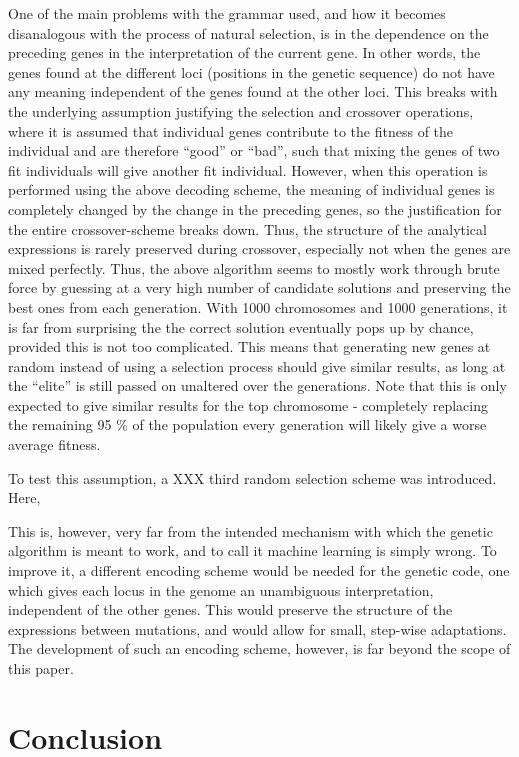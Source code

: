 \documentclass[multicolumn, 12pt]{extarticle}
\begin{document}
One of the main problems with the grammar used, and how it becomes disanalogous with the process of natural selection, is in the dependence on the preceding genes in the interpretation of the current gene. In other words, the genes found at the different loci (positions in the genetic sequence) do not have any meaning independent of the genes found at the other loci. This breaks with the underlying assumption justifying the selection and crossover operations, where it is assumed that individual genes contribute to the fitness of the individual and are therefore ``good'' or ``bad'', such that mixing the genes of two fit individuals will give another fit individual. However, when this operation is performed using the above decoding scheme, the meaning of individual genes is completely changed by the change in the preceding genes, so the justification for the entire crossover-scheme breaks down. Thus, the structure of the analytical expressions is rarely preserved during crossover, especially not when the genes are mixed perfectly. Thus, the above algorithm seems to mostly work through brute force by guessing at a very high number of candidate solutions and preserving the best ones from each generation. With 1000 chromosomes and 1000 generations, it is far from surprising the the correct solution eventually pops up by chance, provided this is not too complicated. This means that generating new genes at random instead of using a selection process should give similar results, as long at the ``elite'' is still passed on unaltered over the generations. Note that this is only expected to give similar results for the top chromosome - completely replacing the remaining 95 \% of the population every generation will likely give a worse average fitness.

To test this assumption, a XXX third random selection scheme was introduced. Here,


This is, however, very far from the intended mechanism with which the genetic algorithm is meant to work, and to call it machine learning is simply wrong. To improve it, a different encoding scheme would be needed for the genetic code, one which gives each locus in the genome an unambiguous interpretation, independent of the other genes. This would preserve the structure of the expressions between mutations, and would allow for small, step-wise adaptations. The development of such an encoding scheme, however, is far beyond the scope of this paper.


\section{Conclusion}



\end{document}
